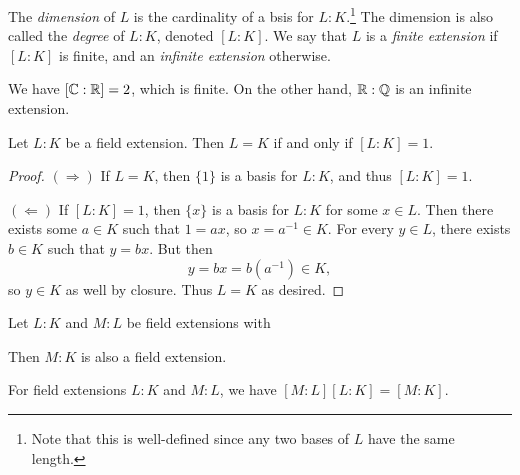 \begin{definition}
  The \emph{dimension} of $L$
  is the cardinality of a bsis for $L : K$.\footnote{Note that this is well-defined since any two bases of $L$ have the same length.}
  The dimension is also called the \emph{degree} of
  $L : K$, denoted $[L : K]$. We say that $L$ is a
  \emph{finite extension} if $[L : K]$ is finite, and
  an \emph{infinite extension} otherwise.
\end{definition}

\begin{example}
  We have $[\mathbb{C} : \mathbb{R}] = 2$, which is finite. On the
  other hand, $\mathbb{R} : \mathbb{Q}$ is an infinite extension.
\end{example}

\begin{theorem}
  Let $L : K$ be a field extension. Then
  $L = K$ if and only if $[L : K] = 1$.
\end{theorem}

\begin{proof}
  $(\Rightarrow)$ If $L = K$, then $\{1\}$ is a basis
  for $L : K$, and thus $[L : K] = 1$.

  $(\Leftarrow)$ If $[L : K] = 1$, then $\{x\}$ is a
  basis for $L : K$ for some $x \in L$. Then there exists
  some $a \in K$ such that $1 = ax$, so
  $x = a^{-1} \in K$. For every $y \in L$, there exists
  $b \in K$ such that $y = bx$. But then
  \[
    y = bx = b(a^{-1}) \in K,
  \]
  so $y \in K$ as well by closure. Thus $L = K$
  as desired.
\end{proof}

\begin{remark}
Let $L : K$ and $M : L$ be field extensions with
\begin{center}
\end{center}
Then $M : K$ is also a field extension.
\end{remark}

\begin{theorem}
  For field extensions $L : K$ and $M : L$, we have
  $[M : L][L : K] = [M : K]$.
\end{theorem}

